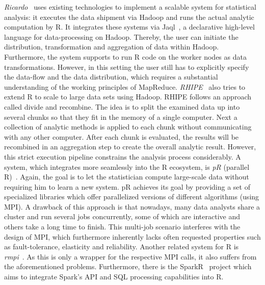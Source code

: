 {\em Ricardo}~\cite{das:2010a} uses existing technologies to implement a scalable system for statistical analysis: it executes the data shipment via Hadoop and runs the actual analytic computation by R. 
It integrates these systems via Jaql~\cite{beyer:2011a}, a declarative high-level language for data-processing on Hadoop. 
Thereby, the user can initiate the distribution, transformation and aggregation of data within Hadoop. 
Furthermore, the system supports to run R code on the worker nodes as data transformations. 
However, in this setting the user still has to explicitly specify the data-flow and the data distribution, which requires a substantial understanding of the working principles of MapReduce. 
{\em RHIPE}~\cite{guha:s2012a} also tries to extend R to scale to large data sets using Hadoop. 
RHIPE follows an approach called divide and recombine. 
The idea is to split the examined data up into several chunks so that they fit in the memory of a single computer. 
Next a collection of analytic methods is applied to each chunk without communicating with any other computer. 
After each chunk is evaluated, the results will be recombined in an aggregation step to create the overall analytic result. 
However, this strict execution pipeline constrains the analysis process considerably. 
A system, which integrates more seamlessly into the R ecosystem, is {\em pR} (parallel R)~\cite{samatova:2009a}. 
Again, the goal is to let the statistician compute large-scale data without requiring him to learn a new system. 
pR achieves its goal by providing a set of specialized libraries which offer parallelized versions of different algorithms (using MPI). 
A drawback of this approach is that nowadays, many data analysts share a cluster and run several jobs concurrently, some of which are interactive and others take a long time to finish. 
This multi-job scenario interferes with the design of MPI, which furthermore inherently lacks often requested properties such as fault-tolerance, elasticity and reliability. 
Another related system for R is {\em rmpi}~\cite{rmpi}. 
As this is only a wrapper for the respective MPI calls, it also suffers from the aforementioned problems. 
Furthermore, there is the SparkR~\cite{Venkataraman2016} project which aims to integrate Spark's API and SQL processing capabilities into R. 


